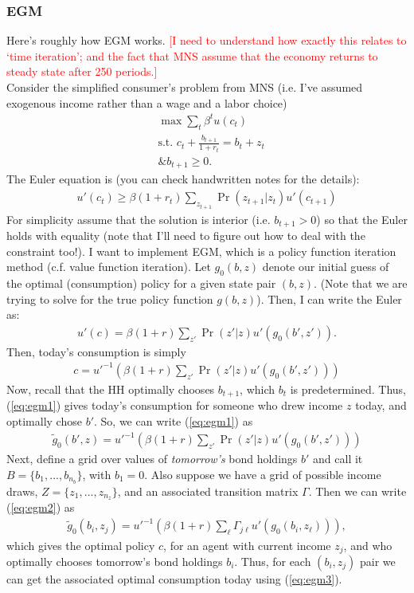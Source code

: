 \documentclass[12pt]{article}
\begin{document}
\subsubsection{EGM}
Here's roughly how EGM works. \textcolor{red}{[I need to understand how exactly this relates to `time iteration'; and the fact that MNS assume that the economy returns to steady state after 250 periods.]} \\

Consider the simplified consumer's problem from MNS (i.e. I've assumed exogenous income rather than a wage and a labor choice)
\begin{align*}
&\max \sum_t \beta^t u(c_t) \\
&\text{s.t. } c_t + \frac{b_{t+1}}{1+r_t} = b_t + z_t\\
&\text{\& } b_{t+1} \geq 0.
\end{align*}
The Euler equation is (you can check handwritten notes for the details):
\begin{align*}
u'(c_t) \geq \beta(1+r_t) \sum_{z_{t+1}}\Pr(z_{t+1}|z_t)u'(c_{t+1})
\end{align*}
For simplicity assume that the solution is interior (i.e. $b_{t+1} > 0$) so that the Euler holds with equality (note that I'll need to figure out how to deal with the constraint too!). I want to implement EGM, which is a policy function iteration method (c.f. value function iteration). Let $g_0(b,z)$ denote our initial guess of the optimal (consumption) policy for a given state pair $(b,z)$. (Note that we are trying to solve for the true policy function $g(b,z)$). Then, I can write the Euler as:
\begin{align*}
u'(c) = \beta(1+r) \sum_{z'}\Pr(z'|z)u'(g_0(b',z')).
\end{align*}
Then, today's consumption is simply
\begin{align}
c = u'^{-1}\left( \beta(1+r) \sum_{z'}\Pr(z'|z)u'(g_0(b',z'))\right) \label{eq:egm1}
\end{align}
Now, recall that the HH optimally chooses $b_{t+1}$, which $b_t$ is predetermined. Thus, (\ref{eq:egm1}) gives today's consumption for someone who drew income $z$ today, and optimally chose $b'$. So, we can write (\ref{eq:egm1}) as
\begin{align}
\tilde g_0(b',z) = u'^{-1}\left( \beta(1+r) \sum_{z'}\Pr(z'|z)u'(g_0(b',z'))\right)  \label{eq:egm2}
\end{align}
Next, define a grid over values of \textit{tomorrow's} bond holdings $b'$ and call it $B = \{b_1, ...,b_{n_b}\}$, with $b_1 = 0$. Also suppose we have a grid of possible income draws, $Z=\{z_1, ..., z_{n_z}\}$, and an associated transition matrix $\Gamma$. Then we can write (\ref{eq:egm2}) as
\begin{align}
\tilde g_0(b_i,z_j) = u'^{-1}\left( \beta(1+r) \sum_{\ell}\Gamma_{j\ell} u'(g_0(b_i, z_\ell))\right) \label{eq:egm3}, 
\end{align}
which gives the optimal policy $c$, for an agent with current income $z_j$, and who optimally chooses tomorrow's bond holdings $b_i$. Thus, for each $(b_i, z_j)$ pair we can get the associated optimal consumption today using (\ref{eq:egm3}).\\
\end{document}

